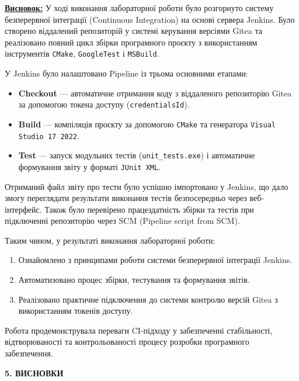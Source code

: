 \documentclass[a4paper,12pt]{article}
\begin{document}
    \textbf{\underline{Висновок:}}
    У ході виконання лабораторної роботи було розгорнуто систему безперервної інтеграції (Continuous Integration) на основі сервера Jenkins. Було створено віддалений репозиторій у системі керування версіями Gitea та реалізовано повний цикл збірки програмного проєкту з використанням інструментів \texttt{CMake}, \texttt{GoogleTest} і \texttt{MSBuild}.

    У Jenkins було налаштовано Pipeline із трьома основними етапами:
    \begin{itemize}
        \item \textbf{Checkout} — автоматичне отримання коду з віддаленого репозиторію Gitea за допомогою токена доступу (\texttt{credentialsId}).
        \item \textbf{Build} — компіляція проєкту за допомогою \texttt{CMake} та генератора \texttt{Visual Studio 17 2022}.
        \item \textbf{Test} — запуск модульних тестів (\texttt{unit\_tests.exe}) і автоматичне формування звіту у форматі \texttt{JUnit XML}.
    \end{itemize}

    Отриманий файл звіту про тести було успішно імпортовано у Jenkins, що дало змогу переглядати результати виконання тестів безпосередньо через веб-інтерфейс. Також було перевірено працездатність збірки та тестів при підключенні репозиторію через SCM (Pipeline script from SCM).

    Таким чином, у результаті виконання лабораторної роботи:
    \begin{enumerate}
        \item Ознайомлено з принципами роботи системи безперервної інтеграції Jenkins.
        \item Автоматизовано процес збірки, тестування та формування звітів.
        \item Реалізовано практичне підключення до системи контролю версій Gitea з використанням токенів доступу.
    \end{enumerate}

    Робота продемонструвала переваги CI-підходу у забезпеченні стабільності, відтворюваності та контрольованості процесу розробки програмного забезпечення.

  \newpage

  \begin{center}
    \label{sec:concl}%
    \textbf{\Large 5. ВИСНОВКИ}
  \end{center}
\end{document}
